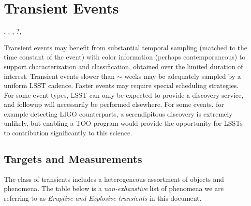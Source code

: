 \section{Transient Events}
\def\secname{\chpname:transients}\label{sec:\secname}

,
,
,
?,

Transient events may benefit from substantial temporal sampling
(matched to the time constant of the event) with color information
(perhaps contemporaneous) to support characterization and
classification, obtained over the limited duration of interest.
Transient events slower than $\sim$ weeks may be adequately sampled by
a uniform LSST cadence.  Faster events may require special scheduling
strategies.  For some event types, LSST can only be expected to
provide a discovery service, and followup will necessarily be
performed elsewhere. 
For some events, for example detecting LIGO counterparts, a serendipitous discovery is extremely unlikely, but enabling a TOO program would provide the opportunity for LSSTs to contribution significantly to this science.



%



\subsection{Targets and Measurements}
\label{sec:\secname:targets}

The class of transients includes a heterogeneous assortment of objects and phenomena. The table below is a \emph{non-exhaustive} list of phenomena we are referring to as \emph{Eruptive and Explosive transients} in this document. 

